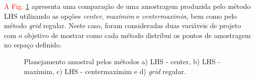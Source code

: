 \textcolor{red}{A Fig. \ref{fig:LHS}} apresenta uma comparação de uma amostragem produzida pelo método LHS utilizando as opções {\it center}, {\it maximim} e {\it centermaximin}, bem como pelo método {\it grid} regular. Neste caso, foram consideradas duas variáveis de projeto com o objetivo de mostrar como cada método distribui os pontos de amostragem no espaço definido.
\begin{figure}[H]
\centering
{} 
\caption{Planejamento amostral pelos métodos a) LHS - center, b) LHS - maximim, c) LHS - centermaximim e d) \textit{grid} regular.}
\label{fig:LHS}
\end{figure}

